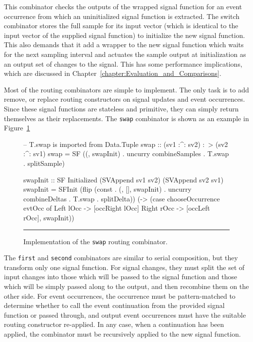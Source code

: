 \documentclass[draft]{llncs}
\begin{document}
This combinator checks the outputs of the wrapped
signal function for an event occurrence from which an uninitialized signal
function is extracted. The switch combinator stores the full sample
for its input vector (which is identical to the input vector of the supplied
signal function) to initialize the new signal function. This also demands that
it add a wrapper to the new signal function which waits for the next sampling
interval and actuates the sample output at initialization as an output set
of changes to the signal. This has some performance implications, which are
discussed in Chapter~\ref{chapter:Evaluation_and_Comparisons}.

Most of the routing combinators are simple to implement. The only task is to add
remove, or replace routing constructors on signal updates and event occurrences.
Since these signal functions are stateless and primitive, they can simply
return themselves as their replacements. The {\tt swap} combinator is shown as
an example in Figure~\ref{figure:swap_implementation}

\begin{figure}
\begin{code}
-- T.swap is imported from Data.Tuple
swap :: (sv1 :^: sv2) :~> (sv2 :^: sv1)
swap =
  SF ((, swapInit) . 
      uncurry combineSamples .
      T.swap . splitSample)

swapInit :: SF Initialized (SVAppend sv1 sv2) (SVAppend sv2 sv1)
swapInit =
  SFInit (flip (const .
                (, [], swapInit) .
                uncurry combineDeltas .
                T.swap . splitDelta))
          (\evtOcc ->
             (case chooseOccurrence evtOcc of
                Left lOcc  -> [occRight lOcc]
                Right rOcc -> [occLeft rOcc], swapInit))

\end{code}
\hrule
\caption{Implementation of the {\tt swap} routing combinator.}
\label{figure:swap_implementation}
\end{figure}

The {\tt first} and {\tt second} combinators are similar to serial composition,
but they transform only one signal function. For signal changes, they must split
the set of input changes into those which will be passed to the signal function
and those which will be simply passed along to the output, and then recombine
them on the other side. For event occurrences, the occurrence must be
pattern-matched to determine whether to call the event continuation from the
provided signal function or passed through, and output event occurrences must
have the suitable routing constructor re-applied. In any case, when a
continuation has been applied, the combinator must be recursively applied to the
new signal function.
\end{document}
